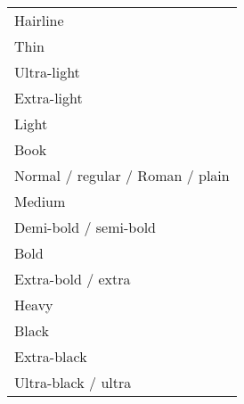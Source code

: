\begin{multicols}{3}
\begin{table}[htbp]
\centering
\begin{tabular}{l}
Hairline\\
Thin\\
Ultra-light\\
Extra-light\\
Light\\
Book\\
Normal / regular / Roman / plain\\
Medium \\
Demi-bold / semi-bold\\
Bold\\
Extra-bold / extra\\
Heavy\\
Black\\
Extra-black\\
Ultra-black / ultra\\
\end{tabular}
\end{table}

\end{multicols}




